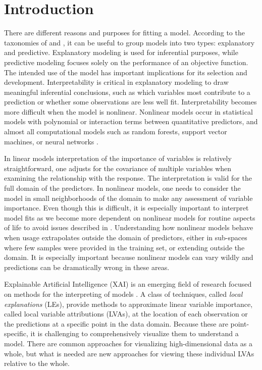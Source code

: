 \documentclass[
]{sn-jnl}
\author{
Nicholas Spyrison~\orcidlink{0000-0002-8417-0212}\\Monash
University \And Dianne Cook~\orcidlink{0000-0002-3813-7155}\\Monash
University \And Przemyslaw
Biecek~\orcidlink{0000-0001-8423-1823}\\University of Warsaw\\
Warsaw University of Technology
}
\title{}
\begin{document}
\hypertarget{sec:intro}{%
\section{Introduction}\label{sec:intro}}

There are different reasons and purposes for fitting a model. According
to the taxonomies of \citet{breiman_statistical_2001} and
\citet{shmueli_explain_2010}, it can be useful to group models into two
types: explanatory and predictive. Explanatory modeling is used for
inferential purposes, while predictive modeling focuses solely on the
performance of an objective function. The intended use of the model has
important implications for its selection and development.
Interpretability is critical in explanatory modeling to draw meaningful
inferential conclusions, such as which variables most contribute to a
prediction or whether some observations are less well fit.
Interpretability becomes more difficult when the model is nonlinear.
Nonlinear models occur in statistical models with polynomial or
interaction terms between quantitative predictors, and almost all
computational models such as random forests, support vector machines, or
neural networks
\citep[e.g.][]{breiman_random_2001, boser_training_1992, anderson_introduction_1995}.

In linear models interpretation of the importance of variables is
relatively straightforward, one adjusts for the covariance of multiple
variables when examining the relationship with the response. The
interpretation is valid for the full domain of the predictors. In
nonlinear models, one needs to consider the model in small neighborhoods
of the domain to make any assessment of variable importance. Even though
this is difficult, it is especially important to interpret model fits as
we become more dependent on nonlinear models for routine aspects of life
to avoid issues described in \citet{stahl-ethics}. Understanding how
nonlinear models behave when usage extrapolates outside the domain of
predictors, either in sub-spaces where few samples were provided in the
training set, or extending outside the domain. It is especially
important because nonlinear models can vary wildly and predictions can
be dramatically wrong in these areas.

Explainable Artificial Intelligence (XAI) is an emerging field of
research focused on methods for the interpreting of models
\citep{adadi_peeking_2018, arrieta_explainable_2020}. A class of
techniques, called \emph{local explanations} (LEs), provide methods to
approximate linear variable importance, called local variable
attributions (LVAs), at the location of each observation or the
predictions at a specific point in the data domain. Because these are
point-specific, it is challenging to comprehensively visualize them to
understand a model. There are common approaches for visualizing
high-dimensional data as a whole, but what is needed are new approaches
for viewing these individual LVAs relative to the whole.
\end{document}
